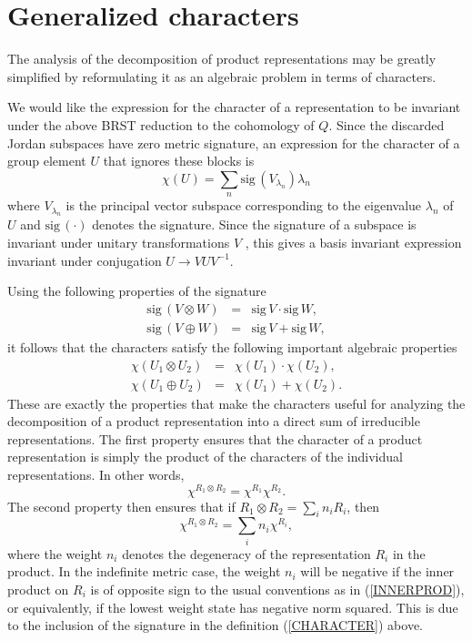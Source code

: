 \documentclass[a4paper,dvips,12pt]{article}
\newcommand {\sig} {\mathrm{sig}\,}
\begin{document}
    \section{Generalized characters}

    The analysis of the decomposition of product representations
    may be greatly simplified by reformulating it as an algebraic
    problem in terms of characters.

    We would like the expression for the character of a representation
    to be invariant under the above
    BRST reduction to the cohomology of $Q$.
    Since the discarded Jordan subspaces have zero metric
    signature, an expression for the character of a
    group element $U$ that ignores these blocks is
    \begin{equation}
        \chi(U) = \sum_n \sig (V_{\lambda_n}) \lambda_n
        \label{CHARACTER}
    \end{equation}
    where $V_{\lambda_n}$ is the principal vector subspace
    corresponding to the eigenvalue $\lambda_n$ of $U$ and $\sig(\cdot)$
    denotes the signature.  Since the signature
    of a subspace is invariant under unitary transformations $V$ \cite{MALCEV}, this
    gives a basis invariant expression
    invariant under conjugation $U \to VUV^{-1}$.

    Using the following properties of the signature
    \begin{eqnarray}
        \sig (V \otimes W) &=& \sig V \cdot \sig W, \\
        \sig (V \oplus W) &=& \sig V + \sig W,
    \end{eqnarray}
    it follows that the characters satisfy the following important
    algebraic properties
    \begin{eqnarray}
        \chi (U_1 \otimes U_2) &=& \chi(U_1) \cdot\chi(U_2), \\
        \chi (U_1 \oplus U_2) &=& \chi(U_1) + \chi(U_2).
    \end{eqnarray}
    These are exactly the properties that make the characters
    useful for analyzing the decomposition of a product
    representation into a direct sum of irreducible representations.
    The first property ensures that the character of a product
    representation is simply the product of the characters of the
    individual representations.  In other words,
    \[
        \chi^{R_1\otimes R_2} = \chi^{R_1} \chi^{R_2}.
    \]
    The second property then ensures that if $R_1\otimes R_2 = \sum_i
    n_i R_i$, then
    \[
        \chi^{R_1\otimes R_2} = \sum_i n_i \chi^{R_i},
    \]
    where the weight $n_i$ denotes the degeneracy of the representation $R_i$
    in the product.  In the indefinite metric case, the weight $n_i$ will
    be negative if the inner product on $R_i$ is of opposite sign to the
    usual conventions as in (\ref{INNERPROD}), or equivalently, if the
    lowest weight state has negative norm squared.
    This is due to the inclusion of the signature in the
    definition (\ref{CHARACTER}) above.
\end{document}
